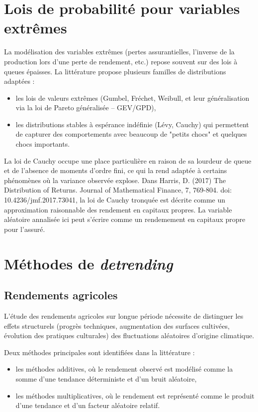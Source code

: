 \documentclass[11pt,a4paper,openright,twoside]{report}
\begin{document}
\section{Lois de probabilité pour variables extrêmes}
La modélisation des variables extrêmes (pertes assurantielles, l'inverse de la production lors d'une perte de rendement, etc.) repose souvent sur des lois à queues épaisses. La littérature propose plusieurs familles de distributions adaptées :  
\begin{itemize}
    \item les lois de valeurs extrêmes (Gumbel, Fréchet, Weibull, et leur généralisation via la loi de Pareto généralisée – GEV/GPD), 
    \item les distributions stables à espérance indéfinie (Lévy, Cauchy) qui permettent de capturer des comportements avec beaucoup de "petits chocs" et quelques chocs importants.
\end{itemize}

La loi de Cauchy occupe une place particulière en raison de sa lourdeur de queue et de l’absence de moments d’ordre fini, ce qui la rend adaptée à certains phénomènes où la variance observée explose. Dans Harris, D. (2017) The Distribution of Returns. Journal of Mathematical Finance, 7, 769-804. doi: 10.4236/jmf.2017.73041, la loi de Cauchy tronquée est décrite comme un approximation raisonnable des rendement en capitaux propres. La variable aléatoire annalisée ici peut s'écrire comme un rendemement en capitaux propre pour l'assuré.

\section{Méthodes de \textit{detrending}}
\subsection{Rendements agricoles}
L’étude des rendements agricoles sur longue période nécessite de distinguer les effets structurels (progrès techniques, augmentation des surfaces cultivées, évolution des pratiques culturales) des fluctuations aléatoires d’origine climatique. 

Deux méthodes principales sont identifiées dans la littérature :  
\begin{itemize}
    \item les méthodes additives, où le rendement observé est modélisé comme la somme d’une tendance déterministe et d’un bruit aléatoire,
    \item les méthodes multiplicatives, où le rendement est représenté comme le produit d’une tendance et d’un facteur aléatoire relatif.
\end{itemize}
\end{document}
